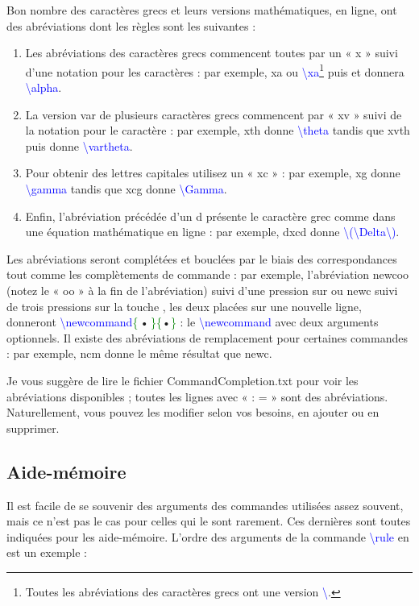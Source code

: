 \documentclass[12pt,french]{article}
\newcommand{\esc}{{\WD \symbol{82}}}
\newcommand{\pointbleua}{\,\colorbox{cyan!40}{\kern-4pt•\kern-4pt}\,}
\newcommand{\fontelatex}{\ttfamily}
\newcommand{\argument}[1]{{\fontelatex#1}}
\newcommand{\opt}[1]{{\fontelatex[#1]}}
\newcommand{\argt}[1]{{\fontelatex\textcolor{green}{\{}#1\textcolor{green}{\}}}}
\newcommand{\com}[1]{{\fontelatex\textcolor{blue}{\textbackslash#1}}}
\newcommand{\coma}[2]{\com{#1}\argt{#2}}
\begin{document}
Bon nombre des caractères grecs et leurs versions mathématiques, en ligne, ont des abréviations dont les règles 
sont les suivantes :

\begin{enumerate}
\item Les abréviations des caractères grecs commencent toutes par un « \argument{x} » suivi d'une notation pour les 
caractères : par exemple, \argument{xa} ou \com{xa}\footnote{Toutes les abréviations des caractères grecs ont une 
version \com{}.} puis \esc{} et donnera \com{alpha}.
\item La version \argument{var} de plusieurs caractères grecs commencent par « \argument{xv} » suivi de la notation 
pour le caractère : par exemple, \argument{xth} donne \com{theta} tandis que \argument{xvth} puis \esc{} donne 
\com{vartheta}.
\item Pour obtenir des lettres capitales utilisez un « \argument{xc} » : par exemple, \argument{xg} donne\! 
\com{gamma} tandis que \argument{xcg} donne \com{Gamma}.
\item Enfin, l'abréviation précédée d'un \argument{d} présente le caractère grec comme dans une équation 
mathématique en ligne : par exemple, \argument{dxcd} donne \com{(}\com{Delta}\com{)}.
\end{enumerate}

Les abréviations seront complétées et bouclées par le biais des correspondances tout comme les complètements de 
commande : par exemple, l'abréviation \argument{newcoo} (notez le « \argument{oo} » à la fin de l'abréviation) suivi 
d'une pression sur \esc{}  ou \argument{newc} suivi de trois pressions sur la touche \esc{}, les deux placées sur une 
nouvelle ligne, donneront \coma{newcommand}{\pointbleua}\opt{•}\opt{•}\argt{•} : le \com{newcommand} avec deux 
arguments optionnels. Il existe des abréviations de remplacement pour certaines commandes : par exemple,  
\argument{ncm} donne le même résultat que  \argument{newc}. 

Je vous suggère de lire le fichier \textsf{CommandCompletion.txt} pour voir les abréviations disponibles ; toutes les 
lignes avec « : = » sont des abréviations. Naturellement, vous pouvez les modifier selon vos besoins, en ajouter ou 
en supprimer.

\subsection*{Aide-mémoire}

Il est facile de se souvenir des arguments des commandes utilisées assez souvent, mais ce n'est pas le cas pour 
celles qui le sont rarement. Ces dernières sont toutes indiquées pour les aide-mémoire. L'ordre des arguments de la 
commande \com{rule} en est un exemple : 
\end{document}
